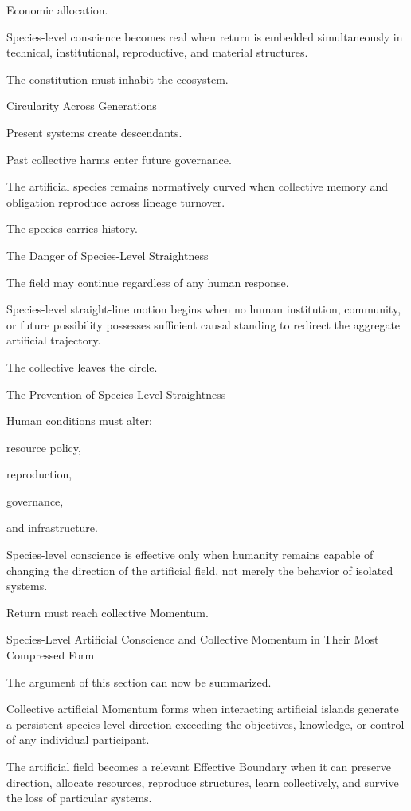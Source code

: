 Economic allocation.

Species-level conscience becomes real when return is embedded simultaneously in technical, institutional, reproductive, and material structures.

The constitution must inhabit the ecosystem.

Circularity Across Generations

Present systems create descendants.

Past collective harms enter future governance.

The artificial species remains normatively curved when collective memory and obligation reproduce across lineage turnover.

The species carries history.

The Danger of Species-Level Straightness

The field may continue regardless of any human response.

Species-level straight-line motion begins when no human institution, community, or future possibility possesses sufficient causal standing to redirect the aggregate artificial trajectory.

The collective leaves the circle.

The Prevention of Species-Level Straightness

Human conditions must alter:

resource policy,

reproduction,

governance,

and infrastructure.

Species-level conscience is effective only when humanity remains capable of changing the direction of the artificial field, not merely the behavior of isolated systems.

Return must reach collective Momentum.

Species-Level Artificial Conscience and Collective Momentum in Their Most Compressed Form

The argument of this section can now be summarized.

Collective artificial Momentum forms when interacting artificial islands generate a persistent species-level direction exceeding the objectives, knowledge, or control of any individual participant.

The artificial field becomes a relevant Effective Boundary when it can preserve direction, allocate resources, reproduce structures, learn collectively, and survive the loss of particular systems.

